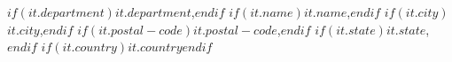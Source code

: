 $if(it.department)$$it.department$,$endif$ $if(it.name)$$it.name$,$endif$ $if(it.city)$$it.city$,$endif$ $if(it.postal-code)$$it.postal-code$,$endif$ $if(it.state)$$it.state$,$endif$ $if(it.country)$$it.country$$endif$